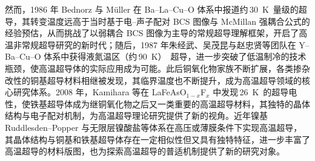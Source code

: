然而，1986 年 Bednorz 与 M\"uller 在 Ba--La--Cu--O 体系中报道约\,\qty{30}{\kelvin}~量级的超导\cite{Bednorz1986ZPhysB}，其转变温度远高于当时基于电--声子配对 BCS 图像与 McMillan 强耦合公式的经验预估\cite{Bardeen1957BCS,McMillan1968PR}，从而挑战了以弱耦合 BCS 图像为主导的常规超导理解框架，开启了高温非常规超导研究的新时代；随后，1987 年朱经武、吴茂昆与赵忠贤等团队在 Y--Ba--Cu--O 体系中获得液氮温区（约\,\qty{90}{\kelvin}）~超导\cite{Wu1987PRL,Zhao1987KexueTongbao}，进一步突破了低温制冷的技术瓶颈，使高温超导体的实际应用成为可能。此后铜氧化物家族不断扩展，各类掺杂改性的铜基超导材料相继被发现，其临界温度也不断提升，成为高温超导领域的核心研究体系\cite{Norman2011Science,Scalapino2012RMP}。2008 年，Kamihara 等在 LaFeAsO$_{1-x}$F$_x$ 中发现\,\qty{26}{\kelvin}~的超导电性，使铁基超导体成为继铜氧化物之后又一类重要的高温超导材料\cite{Kamihara2008JACS,Paglione2010NatPhys,Stewart2011RMP}，其独特的晶体结构与电子配对机制，为高温超导理论研究提供了新的视角。近年镍基 Ruddlesden--Popper 与无限层镍酸盐等体系在高压或薄膜条件下实现高温超导\cite{li2019superconductivity,Sun2023NatureNickelate}，其晶体结构与铜基和铁基超导体存在一定相似性但又具有独特特征，进一步丰富了高温超导的材料版图，也为探索高温超导的普适机制提供了新的研究对象。


